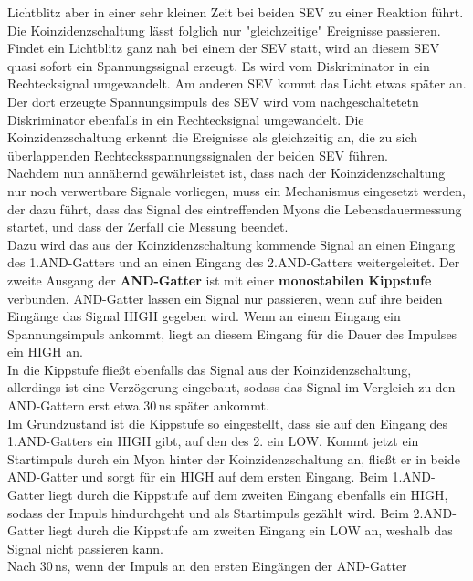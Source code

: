     Lichtblitz aber in einer sehr kleinen Zeit bei beiden SEV zu einer Reaktion
    führt. Die Koinzidenzschaltung lässt folglich nur
    "gleichzeitige" Ereignisse passieren.
    Findet ein Lichtblitz ganz nah bei einem der SEV statt, wird an
    diesem SEV quasi sofort ein Spannungssignal erzeugt. Es wird
    vom Diskriminator in ein Rechtecksignal umgewandelt.
    Am anderen SEV kommt das Licht etwas später an.
    Der dort erzeugte Spannungsimpuls des SEV wird vom nachgeschaltetetn
    Diskriminator ebenfalls in ein Rechtecksignal umgewandelt.
    Die Koinzidenzschaltung erkennt die Ereignisse
    als gleichzeitig an, die zu sich überlappenden Rechtecksspannungssignalen
    der beiden SEV führen.\\
    Nachdem nun annähernd gewährleistet ist, dass nach der Koinzidenzschaltung
    nur noch verwertbare Signale vorliegen, muss ein Mechanismus eingesetzt
    werden, der dazu führt, dass das Signal des eintreffenden Myons die
    Lebensdauermessung startet, und dass der Zerfall die Messung beendet. \\
    Dazu wird das aus der Koinzidenzschaltung kommende Signal an einen Eingang
    des 1.AND-Gatters und an einen Eingang des 2.AND-Gatters weitergeleitet.
    Der zweite Ausgang der \textbf{AND-Gatter} ist mit einer
    \textbf{monostabilen
    Kippstufe} verbunden.
    AND-Gatter lassen ein Signal nur passieren, wenn auf ihre beiden
    Eingänge das Signal HIGH gegeben wird. Wenn an einem Eingang ein
    Spannungsimpuls ankommt, liegt an diesem Eingang für die Dauer
    des Impulses ein HIGH an.\\
    In die Kippstufe fließt ebenfalls das Signal aus der Koinzidenzschaltung, allerdings
    ist eine Verzögerung eingebaut, sodass das Signal im Vergleich zu den AND-Gattern
    erst etwa 30\,ns später ankommt.\\
    Im Grundzustand ist die Kippstufe so eingestellt, dass sie auf den Eingang
    des 1.AND-Gatters ein HIGH gibt, auf den des 2. ein LOW.
    Kommt jetzt ein Startimpuls durch ein Myon hinter der Koinzidenzschaltung
    an, fließt er in beide AND-Gatter und sorgt für ein HIGH auf dem ersten
    Eingang. Beim 1.AND-Gatter liegt durch die Kippstufe auf dem zweiten
    Eingang ebenfalls ein HIGH, sodass der Impuls hindurchgeht und
    als Startimpuls gezählt wird.
    Beim 2.AND-Gatter liegt durch die Kippstufe am zweiten Eingang ein LOW an,
    weshalb das Signal nicht passieren kann.\\
    Nach 30\,ns, wenn der Impuls an den ersten Eingängen der AND-Gatter
